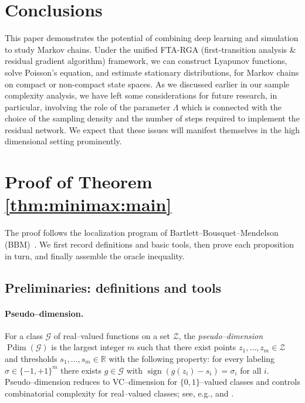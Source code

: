 \documentclass[pdflatex,sn-mathphys-ay]{sn-jnl}%
\numberwithin{equation}{section}
\theoremstyle{thmstyleone}%
\theoremstyle{thmstyletwo}%
\theoremstyle{thmstylethree}%
\begin{document}
\section{Conclusions}
This paper demonstrates the potential of combining deep learning and simulation to study Markov chains. Under the unified FTA-RGA (first-transition analysis \& residual gradient algorithm) framework, we can construct Lyapunov functions, solve Poisson's equation, and estimate stationary distributions, for Markov chains on compact or non-compact state spaces. As we discussed earlier in our sample complexity analysis, we have left some considerations for future research, in particular, involving the role of the parameter $\Lambda$ which is connected with the choice of the sampling density and the number of steps required to implement the residual network. We expect that these issues will manifest themselves in the high dimensional setting prominently. 


\section{Proof of Theorem \ref{thm:minimax:main}}
\label{subsec:minimax:proof}

\providecommand{\Rad}{\mathfrak{R}}
\providecommand{\Pdim}{\operatorname{Pdim}}

The proof follows the localization program of Bartlett–Bousquet–Mendelson (BBM)~\cite{bartlett2005local,koltchinskii2006local}.  We first record definitions and basic tools, then prove each proposition in turn, and finally assemble the oracle inequality.

\subsection{Preliminaries: definitions and tools}
\paragraph{Pseudo–dimension.}
For a class \(\mathcal{G}\) of real–valued functions on a set \(\mathcal{Z}\), the \emph{pseudo–dimension} \(\Pdim(\mathcal{G})\) is the largest integer \(m\) such that there exist points \(z_1,\ldots,z_m\in\mathcal{Z}\) and thresholds \(s_1,\ldots,s_m\in\mathbb{R}\) with the following property: for every labeling \(\sigma\in\{-1,+1\}^m\) there exists \(g\in\mathcal{G}\) with \(\operatorname{sign}(g(z_i)-s_i)=\sigma_i\) for all \(i\).  Pseudo–dimension reduces to VC–dimension for \(\{0,1\}\)–valued classes and controls combinatorial complexity for real–valued classes; see, e.g., \cite[Section 3]{bartlett2019nearly} and \cite{Langer2021}.
\end{document}
